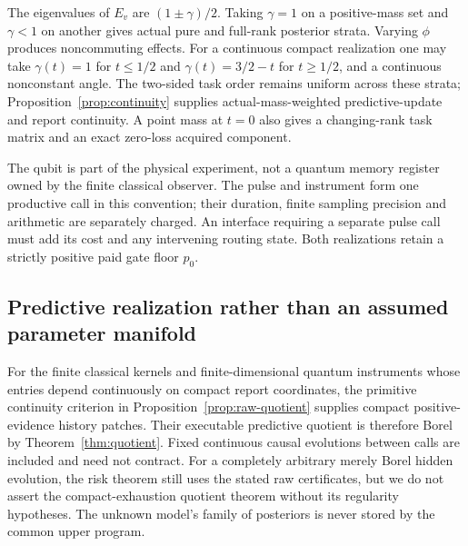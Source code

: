 The eigenvalues of $E_v$ are $(1\pm\gamma)/2$. Taking $\gamma=1$ on a positive-mass set and $\gamma<1$ on another gives actual pure and full-rank posterior strata. Varying $\phi$ produces noncommuting effects. For a continuous compact realization one may take $\gamma(t)=1$ for $t\le1/2$ and $\gamma(t)=3/2-t$ for $t\ge1/2$, and a continuous nonconstant angle. The two-sided task order remains uniform across these strata; Proposition~\ref{prop:continuity} supplies actual-mass-weighted predictive-update and report continuity. A point mass at $t=0$ also gives a changing-rank task matrix and an exact zero-loss acquired component.

The qubit is part of the physical experiment, not a quantum memory register owned by the finite classical observer. The pulse and instrument form one productive call in this convention; their duration, finite sampling precision and arithmetic are separately charged. An interface requiring a separate pulse call must add its cost and any intervening routing state. Both realizations retain a strictly positive paid gate floor $p_0$.

\subsection*{Predictive realization rather than an assumed parameter manifold}
For the finite classical kernels and finite-dimensional quantum instruments whose entries depend continuously on compact report coordinates, the primitive continuity criterion in Proposition~\ref{prop:raw-quotient} supplies compact positive-evidence history patches. Their executable predictive quotient is therefore Borel by Theorem~\ref{thm:quotient}. Fixed continuous causal evolutions between calls are included and need not contract. For a completely arbitrary merely Borel hidden evolution, the risk theorem still uses the stated raw certificates, but we do not assert the compact-exhaustion quotient theorem without its regularity hypotheses. The unknown model's family of posteriors is never stored by the common upper program.
